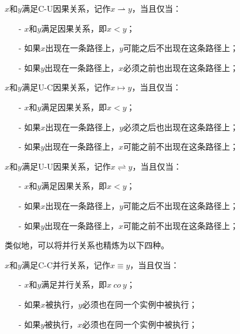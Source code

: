 \begin{definition}\label{def:c_u_causal}
$x$和$y$满足C-U因果关系，记作$x\rightharpoonup y$，当且仅当：
  \begin{itemize}
    \item[-] $x$和$y$满足因果关系，即$x<y$；
    \item[-] 如果$x$出现在一条路径上，$y$可能之后不出现在这条路径上；
    \item[-] 如果$y$出现在一条路径上，$x$必须之前也出现在这条路径上；
  \end{itemize}
\end{definition}

\begin{definition}\label{def:u_c_causal}
$x$和$y$满足U-C因果关系，记作$x\mapsto y$，当且仅当：
  \begin{itemize}
    \item[-] $x$和$y$满足因果关系，即$x<y$；
    \item[-] 如果$x$出现在一条路径上，$y$必须之后也出现在这条路径上；
    \item[-] 如果$y$出现在一条路径上，$x$可能之前不出现在这条路径上；
  \end{itemize}
\end{definition}

\begin{definition}\label{def:u_u_causal}
$x$和$y$满足U-U因果关系，记作$x\rightleftharpoons y$，当且仅当：
  \begin{itemize}
    \item[-] $x$和$y$满足因果关系，即$x<y$；
    \item[-] 如果$x$出现在一条路径上，$y$可能之后不出现在这条路径上；
    \item[-] 如果$y$出现在一条路径上，$x$可能之前不出现在这条路径上；
  \end{itemize}
\end{definition}

类似地，可以将并行关系也精炼为以下四种。

\begin{definition}\label{def:c_c_concurrency}
$x$和$y$满足C-C并行关系，记作$x\equiv y$，当且仅当：
  \begin{itemize}
    \item[-] $x$和$y$满足并行关系，即$x~co~y$；
    \item[-] 如果$x$被执行，$y$必须也在同一个实例中被执行；
    \item[-] 如果$y$被执行，$x$必须也在同一个实例中被执行；
  \end{itemize}
\end{definition}


